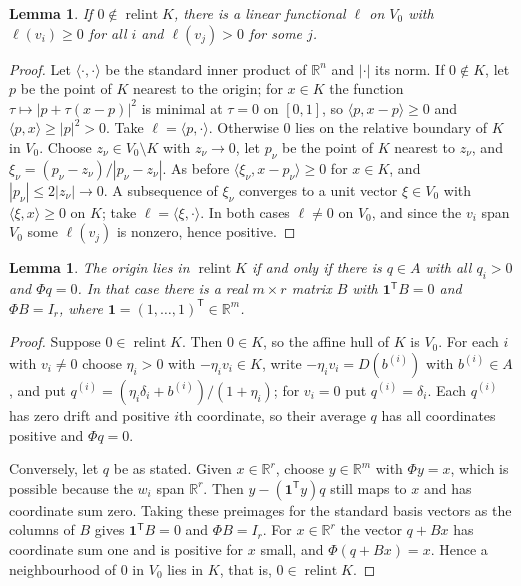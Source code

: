 \documentclass[11pt]{article}
\newtheorem{lemma}[theorem]{Lemma}
\theoremstyle{remark}
\DeclareMathOperator{\relint}{relint}
\newcommand{\R}{\mathbb{R}}
\newcommand{\one}{\mathbf{1}}
\begin{document}
\begin{lemma}\label{lem:sep}
If $0\notin\relint K$, there is a linear functional $\ell$ on $V_0$ with $\ell(v_i)\ge 0$ for all $i$ and
$\ell(v_j)>0$ for some $j$.
\end{lemma}

\begin{proof}
Let $\langle\cdot,\cdot\rangle$ be the standard inner product of $\R^n$ and $|\cdot|$ its norm. If $0\notin K$, let $p$
be the point of $K$ nearest to the origin; for $x\in K$ the function $\tau\mapsto|p+\tau(x-p)|^2$ is minimal at $\tau=0$ on $[0,1]$, so $\langle p,x-p\rangle\ge 0$ and
$\langle p,x\rangle\ge|p|^2>0$. Take $\ell=\langle p,\cdot\rangle$. Otherwise $0$ lies on the relative boundary of $K$
in $V_0$. Choose $z_\nu\in V_0\setminus K$ with $z_\nu\to 0$, let $p_\nu$ be the point of $K$ nearest to $z_\nu$, and
$\xi_\nu=(p_\nu-z_\nu)/|p_\nu-z_\nu|$. As before $\langle \xi_\nu,x-p_\nu\rangle\ge 0$ for $x\in K$, and
$|p_\nu|\le 2|z_\nu|\to 0$. A subsequence of $\xi_\nu$ converges to a unit vector $\xi\in V_0$ with
$\langle \xi,x\rangle\ge 0$ on $K$; take $\ell=\langle \xi,\cdot\rangle$. In both cases $\ell\neq 0$ on $V_0$, and since the
$v_i$ span $V_0$ some $\ell(v_j)$ is nonzero, hence positive.
\end{proof}

\begin{lemma}\label{lem:center}
The origin lies in $\relint K$ if and only if there is $q\in A$ with all $q_i>0$ and $\Phi q=0$. In that case there is a
real $m\times r$ matrix $B$ with $\one^{\mathsf T}B=0$ and $\Phi B=I_r$, where $\one=(1,\dots,1)^{\mathsf T}\in\R^m$.
\end{lemma}

\begin{proof}
Suppose $0\in\relint K$. Then $0\in K$, so the affine hull of $K$ is $V_0$. For each $i$ with $v_i\neq 0$ choose
$\eta_i>0$ with $-\eta_iv_i\in K$, write $-\eta_iv_i=D(b^{(i)})$ with $b^{(i)}\in A$, and put
$q^{(i)}=(\eta_i\delta_i+b^{(i)})/(1+\eta_i)$; for $v_i=0$ put $q^{(i)}=\delta_i$. Each $q^{(i)}$ has zero drift and positive
$i$th coordinate, so their average $q$ has all coordinates positive and $\Phi q=0$.

Conversely, let $q$ be as stated. Given $x\in\R^r$, choose $y\in\R^m$ with $\Phi y=x$, which is possible because the $w_i$
span $\R^r$. Then $y-(\one^{\mathsf T}y)q$ still maps to $x$ and has coordinate sum zero. Taking these preimages for the
standard basis vectors as the columns of $B$ gives $\one^{\mathsf T}B=0$ and $\Phi B=I_r$. For $x\in\R^r$ the vector
$q+Bx$ has coordinate sum one and is positive for $x$ small, and $\Phi (q+Bx)=x$. Hence a neighbourhood of $0$ in $V_0$ lies
in $K$, that is, $0\in\relint K$.
\end{proof}
\end{document}
